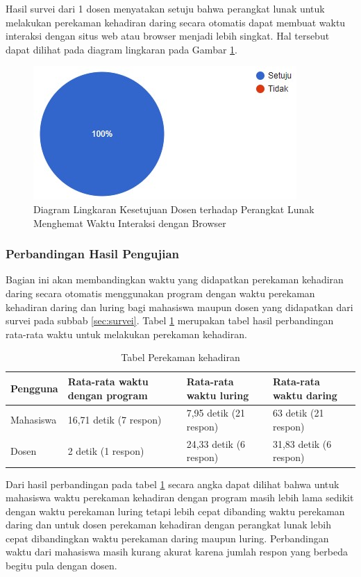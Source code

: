 Hasil survei dari 1 dosen menyatakan setuju bahwa perangkat lunak untuk melakukan perekaman kehadiran daring secara otomatis dapat membuat waktu interaksi dengan situs web atau browser menjadi lebih singkat. Hal tersebut dapat dilihat pada diagram lingkaran pada Gambar \ref{fig:interaksiDosen}.
\begin{figure}[H]
	\centering
	\includegraphics[scale=0.7]{Gambar/diagramLingkaran.jpg}
	\caption{Diagram Lingkaran Kesetujuan Dosen terhadap Perangkat Lunak Menghemat Waktu Interaksi dengan Browser} 
	\label{fig:interaksiDosen}
\end{figure}

\subsubsection{Perbandingan Hasil Pengujian}
Bagian ini akan membandingkan waktu yang didapatkan perekaman kehadiran daring secara otomatis menggunakan program dengan waktu perekaman kehadiran daring dan luring bagi mahasiswa maupun dosen yang didapatkan dari survei pada subbab \ref{sec:survei}. Tabel \ref{tab:banding} merupakan tabel hasil perbandingan rata-rata waktu untuk melakukan perekaman kehadiran.
\begin{table}[H]			
 	\caption{Tabel Perekaman kehadiran}
 	\centering
 	\begin{tabular}{|p{2cm} |p{4cm} |p{4cm}| p{4cm}|} \hline
 		Pengguna & Rata-rata waktu dengan program & Rata-rata waktu luring & Rata-rata waktu daring\\ \hline     
 		Mahasiswa & 16,71 detik (7 respon)& 7,95 detik (21 respon)& 63 detik (21 respon)\\ \hline 
 		Dosen & 2 detik (1 respon)&  24,33 detik (6 respon)& 31,83 detik (6 respon)\\ \hline 
 	\end{tabular}
 	\label{tab:banding} 
\end{table}
Dari hasil perbandingan pada tabel \ref{tab:banding} secara angka dapat dilihat bahwa untuk mahasiswa waktu perekaman kehadiran dengan program masih lebih lama sedikit dengan waktu perekaman luring tetapi lebih cepat dibanding waktu perekaman daring dan untuk dosen perekaman kehadiran dengan perangkat lunak lebih cepat dibandingkan waktu perekaman daring maupun luring. Perbandingan waktu dari mahasiswa masih kurang akurat karena jumlah respon yang berbeda begitu pula dengan dosen.